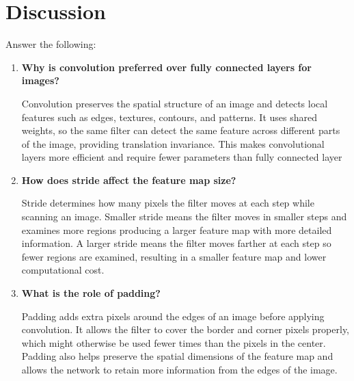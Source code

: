 \documentclass[11pt]{article}
\begin{document}
\section{Discussion}
Answer the following:
\begin{enumerate}
    \item \textbf{Why is convolution preferred over fully connected layers for images?}
    
    \vspace{5mm}

    Convolution preserves the spatial structure of an image and detects local features such as edges, textures, contours, and patterns. 
    It uses shared weights, so the same filter can detect the same feature across different parts of the image, providing translation invariance. 
    This makes convolutional layers more efficient and require fewer parameters than fully connected layer
    
    \vspace{3mm}

    \item \textbf{How does stride affect the feature map size?}
    
    \vspace{5mm}

    Stride determines how many pixels the filter moves at each step while scanning an image. 
    Smaller stride means the filter moves in smaller steps and examines more regions producing a larger feature map with more detailed information. 
    A larger stride means the filter moves farther at each step so fewer regions are examined, resulting in a smaller feature map and lower computational cost.
    
    \vspace{3mm}

    \item \textbf{What is the role of padding?}
    
    \vspace{5mm}

    Padding adds extra pixels around the edges of an image before applying convolution. 
    It allows the filter to cover the border and corner pixels properly, which might otherwise be used fewer times than the pixels in the center. 
    Padding also helps preserve the spatial dimensions of the feature map and allows the network to retain more information from the edges of the image.  

    \vspace{3mm}


\end{enumerate}
\end{document}
